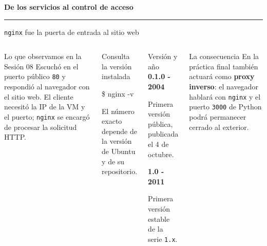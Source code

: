 \documentclass[aspectratio=169,10pt,c]{beamer}
\begin{document}
\begin{frame}[plain]
\vfill
\begin{center}
{\fontsize{29}{34}\selectfont\bfseries De los servicios al control de acceso}
\par\vspace{4mm}
{\color{utpRojo}\rule{8.5cm}{1.2pt}}
\end{center}
\vfill
\end{frame}

\begin{frame}{\texttt{nginx} fue la puerta de entrada al sitio web}
\begin{columns}[T,onlytextwidth]
\begin{block}{Lo que observamos en la Sesión 08}
\small Escuchó en el puerto público \texttt{80} y respondió al navegador con el sitio web. El cliente necesitó la IP de la VM y el puerto; \texttt{nginx} se encargó de procesar la solicitud HTTP.
\end{block}
\begin{exampleblock}{Consulta la versión instalada}
\begin{terminal}\footnotesize
\$ nginx -v
\end{terminal}
\small El número exacto depende de la versión de Ubuntu y de su repositorio.
\end{exampleblock}
\begin{exampleblock}{Versión y año}
\small
\textbf{0.1.0 - 2004}\par
Primera versión pública, publicada el 4 de octubre.\par\medskip
\textbf{1.0 - 2011}\par
Primera versión estable de la serie \texttt{1.x}.
\end{exampleblock}
\begin{alertblock}{La consecuencia}
\small En la práctica final también actuará como \textbf{proxy inverso}: el navegador hablará con \texttt{nginx} y el puerto \texttt{3000} de Python podrá permanecer cerrado al exterior.
\end{alertblock}
\end{columns}
\end{frame}
\end{document}
